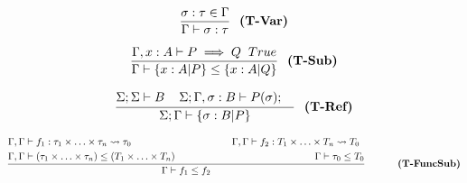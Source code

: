 
\begin{minipage}[c]{0.1\textwidth}
    \[
    \frac{\sigma : \tau \in \Gamma}
    {\Gamma\vdash\sigma:\tau} \hspace{0.25cm} \textbf{(T-Var)}
    \]
\end{minipage}
\hfill
\begin{minipage}[c]{0.28\textwidth}
    \[
    \frac{\Gamma, x:A \vdash P \implies Q\hspace{0.2cm}True}
    {\Gamma\vdash \{x: A|P\} \leq \{x:A|Q\} } \hspace{0.25cm} \textbf{(T-Sub)}
    \]
\end{minipage}
\hfill
\begin{minipage}[c]{0.39\textwidth}
    \[
    \frac{      \begin{aligned}
        &\Sigma; \Sigma\vdash B\hspace{0.4cm}
        \Sigma; \Gamma, \sigma:B \vdash P(\sigma);
      \end{aligned}}
    {\Sigma;\Gamma\vdash \{ \sigma: B|P \} } \hspace{0.25cm} \textbf{(T-Ref)}
    \]
\end{minipage}
\hfill



\begin{minipage}[c]{0.1\textwidth}
    \[
    \frac{
        \begin{aligned}
            &\Gamma,\Gamma\vdash f_1: \tau_1\times \ldots\times \tau_n \rightsquigarrow \tau_0 \hspace{3.6cm}\Gamma,\Gamma\vdash f_2: T_1\times \ldots\times T_n \rightsquigarrow T_0 \\
            &\Gamma,\Gamma\vdash (\tau_1 \times \ldots \times \tau_n) \leq (T_1 \times \ldots \times T_n) \hspace{5cm} \Gamma\vdash \tau_0 \leq T_0
        \end{aligned}
    }
    {\Gamma\vdash f_1 \leq f_2 } \hspace{1.15cm} \textbf{(T-FuncSub)}
    \]
\end{minipage}
\hfill


